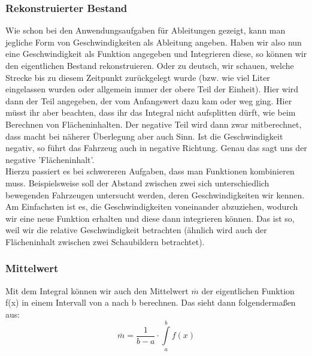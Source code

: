 \subsubsection{Rekonstruierter Bestand}
Wie schon bei den Anwendungsaufgaben für Ableitungen gezeigt, kann man jegliche Form von Geschwindigkeiten als Ableitung angeben. Haben wir also nun eine Geschwindigkeit als Funktion angegeben und Integrieren diese, so können wir den eigentlichen Bestand rekonstruieren. Oder zu deutsch, wir schauen, welche Strecke bis zu diesem Zeitpunkt zurückgelegt wurde (bzw. wie viel Liter eingelassen wurden oder allgemein immer der obere Teil der Einheit). Hier wird dann der Teil angegeben, der vom Anfangswert dazu kam oder weg ging. Hier müsst ihr aber beachten, dass ihr das Integral nicht aufsplitten dürft, wie beim Berechnen von Flächeninhalten. Der negative Teil wird dann zwar mitberechnet, dass macht bei näherer Überlegung aber auch Sinn. Ist die Geschwindigkeit negativ, so führt das Fahrzeug auch in negative Richtung. Genau das sagt uns der negative 'Flächeninhalt'.\\
Hierzu passiert es bei schwereren Aufgaben, dass man Funktionen kombinieren muss. Beispielsweise soll der Abstand zwischen zwei sich unterschiedlich bewegenden Fahrzeugen untersucht werden, deren Geschwindigkeiten wir kennen. Am Einfachsten ist es, die Geschwindigkeiten voneinander abzuziehen, wodurch wir eine neue Funktion erhalten und diese dann integrieren können. Das ist so, weil wir die relative Geschwindigkeit betrachten (ähnlich wird auch der Flächeninhalt zwischen zwei Schaubildern betrachtet).
\subsubsection{Mittelwert}
Mit dem Integral können wir auch den Mittelwert \(\overline{m}\) der eigentlichen Funktion f(x) in einem Intervall von a nach b berechnen. Das sieht dann folgendermaßen aus:
\[\overline{m}=\frac{1}{b-a}\cdot \int\limits_a^b f(x)\]
